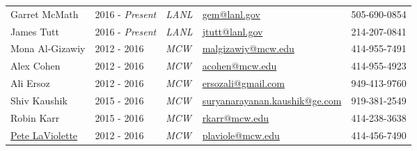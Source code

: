 
\begin{center}
\begin{minipage}{\textwidth}
\begin{tabular}{p{3.2cm}p{2.2cm}p{2.7cm}p{5.0cm}p{2.4cm}}

{Garret McMath} \label{garret_mcmath}& {2016 - \emph{Present}} & {\textit{LANL}} &  \href{mailto:gem@lanl.gov}{gem@lanl.gov} & 505-690-0854 \\ %

{James Tutt} \label{james_tutt}& {2016 - \emph{Present}} & {\textit{LANL}} &  \href{mailto:jtutt@lanl.gov}{jtutt@lanl.gov} & 214-207-0841 \\ %

{Mona Al-Gizawiy} \label{mona_algiazwiy}& {2012 - 2016} & {\textit{MCW}} &  \href{mailto:malgizawiy@mcw.edu}{malgizawiy@mcw.edu} & 414-955-7491 \\ %

{Alex Cohen} \label{alex_cohen}& {2012 - 2016} & {\textit{MCW}} &  \href{mailto:acohen@mcw.edu}{acohen@mcw.edu} & 414-955-4923 \\ %

{Ali Ersoz} \label{ali_ersoz}& {2012 - 2016} & {\textit{MCW}} &  \href{mailto:ersozali@gmail.com}{ersozali@gmail.com} & 949-413-9760 \\ %


{Shiv Kaushik} \label{robin_karr}& {2015 - 2016} & {\textit{MCW}} &  \href{mailto:suryanarayanan.kaushik@ge.com}{suryanarayanan.kaushik@ge.com} & 919-381-2549 \\ %

{Robin Karr} \label{robin_karr}& {2015 - 2016} & {\textit{MCW}} &  \href{mailto:rkarr@mcw.edu}{rkarr@mcw.edu} & 414-238-3638 \\ %

\href{http://www.mcw.edu/radiology/faculty/PeterLaViolette.htm}{Pete LaViolette} \label{pete_laviolette}& {2012 - 2016} & {\textit{MCW}} &  \href{mailto:plaviole@mcw.edu}{plaviole@mcw.edu} & 414-456-7490 \\ %


\end{tabular}
\end{minipage}
\end{center}
